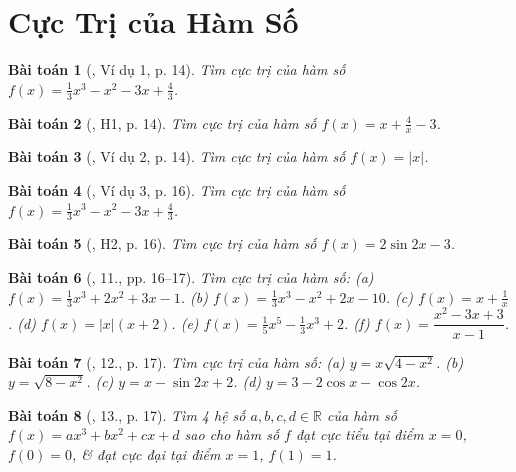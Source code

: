 \documentclass{article}
\newtheorem{baitoan}{Bài toán}
\begin{document}

\section{Cực Trị của Hàm Số}

\begin{baitoan}[\cite{SGK_Toan_12_giai_tich_nang_cao}, Ví dụ 1, p. 14]
	Tìm cực trị của hàm số $f(x) = \frac{1}{3}x^3 - x^2 - 3x + \frac{4}{3}$.
\end{baitoan}

\begin{baitoan}[\cite{SGK_Toan_12_giai_tich_nang_cao}, H1, p. 14]
	Tìm cực trị của hàm số $f(x) = x + \frac{4}{x} - 3$.
\end{baitoan}

\begin{baitoan}[\cite{SGK_Toan_12_giai_tich_nang_cao}, Ví dụ 2, p. 14]
	Tìm cực trị của hàm số $f(x) = |x|$.
\end{baitoan}

\begin{baitoan}[\cite{SGK_Toan_12_giai_tich_nang_cao}, Ví dụ 3, p. 16]
	Tìm cực trị của hàm số $f(x) = \frac{1}{3}x^3 - x^2 - 3x + \frac{4}{3}$.
\end{baitoan}

\begin{baitoan}[\cite{SGK_Toan_12_giai_tich_nang_cao}, H2, p. 16]
	Tìm cực trị của hàm số $f(x) = 2\sin2x - 3$.
\end{baitoan}

\begin{baitoan}[\cite{SGK_Toan_12_giai_tich_nang_cao}, 11., pp. 16--17]
	Tìm cực trị của hàm số: (a) $f(x) = \frac{1}{3}x^3 + 2x^2 + 3x - 1$. (b) $f(x) = \frac{1}{3}x^3 - x^2 + 2x - 10$. (c) $f(x) = x + \frac{1}{x}$. (d) $f(x) = |x|(x + 2)$. (e) $f(x) = \frac{1}{5}x^5 - \frac{1}{3}x^3 + 2$. (f) $f(x) = \dfrac{x^2 - 3x + 3}{x - 1}$.
\end{baitoan}

\begin{baitoan}[\cite{SGK_Toan_12_giai_tich_nang_cao}, 12., p. 17]
	Tìm cực trị của hàm số: (a) $y = x\sqrt{4 - x^2}$. (b) $y = \sqrt{8 - x^2}$. (c) $y = x - \sin2x + 2$. (d) $y = 3 - 2\cos x - \cos2x$.
\end{baitoan}

\begin{baitoan}[\cite{SGK_Toan_12_giai_tich_nang_cao}, 13., p. 17]
	Tìm 4 hệ số $a,b,c,d\in\mathbb{R}$ của hàm số $f(x) = ax^3 + bx^2 + cx + d$ sao cho hàm số $f$ đạt cực tiểu tại điểm $x = 0$, $f(0) = 0$, \& đạt cực đại tại điểm $x = 1$, $f(1) = 1$.
\end{baitoan}
\end{document}

